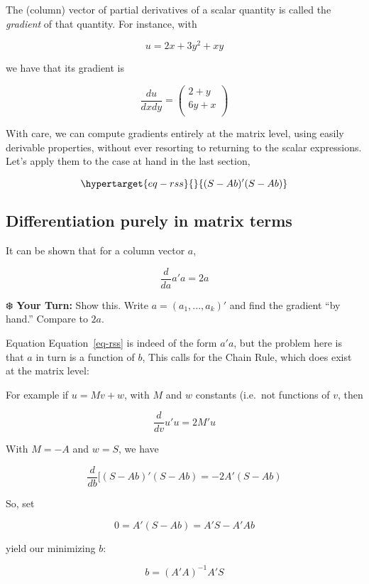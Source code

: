 \documentclass[
  letterpaper,
  DIV=11,
  numbers=noendperiod,
  oneside]{scrreprt}
\begin{document}
The (column) vector of partial derivatives of a scalar quantity is
called the \emph{gradient} of that quantity. For instance, with

\[
u = 2x + 3y^2 + xy
\]

we have that its gradient is

\[
 \frac{du}{dx dy} =
 \left (
 \begin{array}{rr}
 2 + y \\
 6y + x \\
 \end{array}
 \right )
\]

With care, we can compute gradients entirely at the matrix level, using
easily derivable properties, without ever resorting to returning to the
scalar expressions. Let's apply them to the case at hand in the last
section,

\begin{equation}\protect\hypertarget{eq-rss}{}{
(S - Ab)'(S - Ab)
}\label{eq-rss}\end{equation}

\hypertarget{differentiation-purely-in-matrix-terms}{%
\subsection{Differentiation purely in matrix
terms}\label{differentiation-purely-in-matrix-terms}}

It can be shown that for a column vector \(a\),

\[
\frac{d}{da} a'a = 2a
\]

❄️ \textbf{Your Turn:} Show this. Write \(a = (a_1,...,a_k)'\) and find
the gradient ``by hand.'' Compare to \(2a\).

Equation Equation~\ref{eq-rss} is indeed of the form \(a'a\), but the
problem here is that \(a\) in turn is a function of \(b\), This calls
for the Chain Rule, which does exist at the matrix level:

For example if \(u = Mv + w\), with \(M\) and \(w\) constants (i.e.~not
functions of \(v\), then

\[
\frac{d}{dv} u'u = 2M'u
\]

With \(M = -A\) and \(w = S\), we have

\[
\frac{d}{db} [(S - Ab)'(S - Ab) = -2 A'(S - Ab)
\]

So, set

\[
0 = A'(S - Ab) = A'S - A'A b
\]

yield our minimizing \(b\):

\[
b = (A'A)^{-1} A'S
\]
\end{document}
